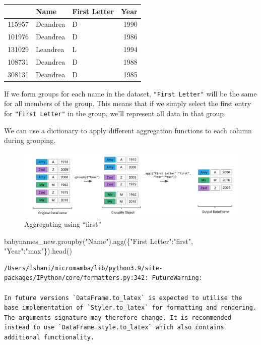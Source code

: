 \documentclass[
  letterpaper,
  DIV=11,
  numbers=noendperiod]{scrreprt}
\newenvironment{Shaded}{\begin{snugshade}}{\end{snugshade}}
\newcommand{\NormalTok}[1]{\textcolor[rgb]{0.00,0.23,0.31}{#1}}
\newcommand{\StringTok}[1]{\textcolor[rgb]{0.13,0.47,0.30}{#1}}
\begin{document}
\begin{tabular}{lllr}
\toprule
{} &      Name & First Letter &  Year \\
\midrule
115957 &  Deandrea &            D &  1990 \\
101976 &  Deandrea &            D &  1986 \\
131029 &  Leandrea &            L &  1994 \\
108731 &  Deandrea &            D &  1988 \\
308131 &  Deandrea &            D &  1985 \\
\bottomrule
\end{tabular}

If we form groups for each name in the dataset, \texttt{"First\ Letter"}
will be the same for all members of the group. This means that if we
simply select the first entry for \texttt{"First\ Letter"} in the group,
we'll represent all data in that group.

We can use a dictionary to apply different aggregation functions to each
column during grouping.

\begin{figure}

{\centering \includegraphics{pandas_3/images/first.png}

}

\caption{Aggregating using ``first''}

\end{figure}

\begin{Shaded}
\begin{Highlighting}[]
\NormalTok{babynames\_new.groupby(}\StringTok{"Name"}\NormalTok{).agg(\{}\StringTok{"First Letter"}\NormalTok{:}\StringTok{"first"}\NormalTok{, }\StringTok{"Year"}\NormalTok{:}\StringTok{"max"}\NormalTok{\}).head()}
\end{Highlighting}
\end{Shaded}

\begin{verbatim}
/Users/Ishani/micromamba/lib/python3.9/site-packages/IPython/core/formatters.py:342: FutureWarning:

In future versions `DataFrame.to_latex` is expected to utilise the base implementation of `Styler.to_latex` for formatting and rendering. The arguments signature may therefore change. It is recommended instead to use `DataFrame.style.to_latex` which also contains additional functionality.
\end{verbatim}
\end{document}
